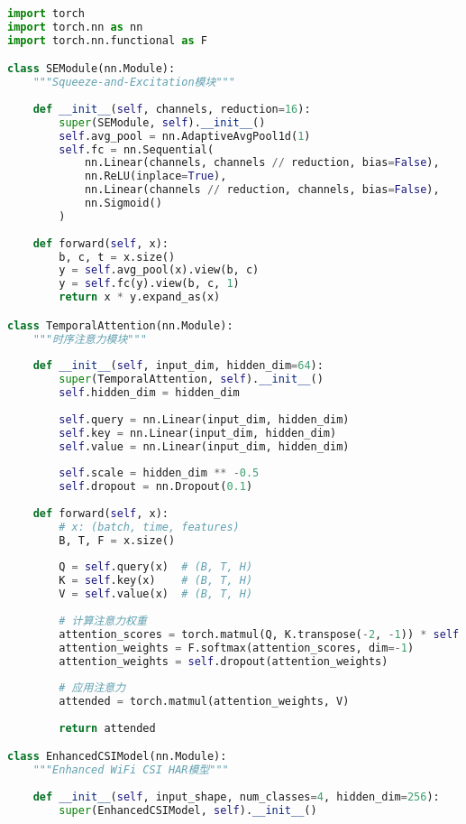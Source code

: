 \begin{lstlisting}[language=Python,caption=Enhanced模型完整实现]
import torch
import torch.nn as nn
import torch.nn.functional as F

class SEModule(nn.Module):
    """Squeeze-and-Excitation模块"""
    
    def __init__(self, channels, reduction=16):
        super(SEModule, self).__init__()
        self.avg_pool = nn.AdaptiveAvgPool1d(1)
        self.fc = nn.Sequential(
            nn.Linear(channels, channels // reduction, bias=False),
            nn.ReLU(inplace=True),
            nn.Linear(channels // reduction, channels, bias=False),
            nn.Sigmoid()
        )
    
    def forward(self, x):
        b, c, t = x.size()
        y = self.avg_pool(x).view(b, c)
        y = self.fc(y).view(b, c, 1)
        return x * y.expand_as(x)

class TemporalAttention(nn.Module):
    """时序注意力模块"""
    
    def __init__(self, input_dim, hidden_dim=64):
        super(TemporalAttention, self).__init__()
        self.hidden_dim = hidden_dim
        
        self.query = nn.Linear(input_dim, hidden_dim)
        self.key = nn.Linear(input_dim, hidden_dim)
        self.value = nn.Linear(input_dim, hidden_dim)
        
        self.scale = hidden_dim ** -0.5
        self.dropout = nn.Dropout(0.1)
        
    def forward(self, x):
        # x: (batch, time, features)
        B, T, F = x.size()
        
        Q = self.query(x)  # (B, T, H)
        K = self.key(x)    # (B, T, H)
        V = self.value(x)  # (B, T, H)
        
        # 计算注意力权重
        attention_scores = torch.matmul(Q, K.transpose(-2, -1)) * self.scale
        attention_weights = F.softmax(attention_scores, dim=-1)
        attention_weights = self.dropout(attention_weights)
        
        # 应用注意力
        attended = torch.matmul(attention_weights, V)
        
        return attended

class EnhancedCSIModel(nn.Module):
    """Enhanced WiFi CSI HAR模型"""
    
    def __init__(self, input_shape, num_classes=4, hidden_dim=256):
        super(EnhancedCSIModel, self).__init__()
        

\end{lstlisting}
